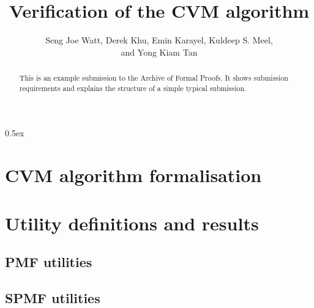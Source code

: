 \documentclass[11pt, a4paper]{report}
\begin{document}
\title{Verification of the CVM algorithm}

\author{
  Seng Joe Watt,
  Derek Khu,
  Emin Karayel,
  Kuldeep S. Meel,
  \\
  and Yong Kiam Tan}

\maketitle

\begin{abstract}
  This is an example submission to the Archive of Formal Proofs. It
  shows submission requirements and explains the structure of a simple
  typical submission.
\end{abstract}

\tableofcontents

\parindent 0pt
\parskip 0.5ex

\chapter{CVM algorithm formalisation}










\chapter{Utility definitions and results}






\section{PMF utilities}






\section{SPMF utilities}





% 
% 
\end{document}
